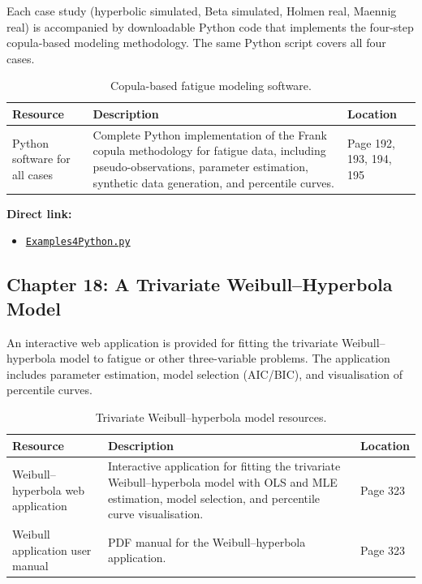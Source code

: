 Each case study (hyperbolic simulated, Beta simulated, Holmen real, Maennig real) is accompanied by downloadable Python code that implements the four-step copula-based modeling methodology. The same Python script covers all four cases.

\begin{table}[H]
\centering
\caption{Copula-based fatigue modeling software.}
\begin{tabular}{p{3.5cm}p{8cm}p{2.5cm}}
\toprule
\textbf{Resource} & \textbf{Description} & \textbf{Location} \\
\midrule
Python software for all cases & Complete Python implementation of the Frank copula methodology for fatigue data, including pseudo-observations, parameter estimation, synthetic data generation, and percentile curves. & Page 192, 193, 194, 195 \\
\bottomrule
\end{tabular}
\end{table}

\noindent
\textbf{Direct link:}
\begin{itemize}
    \item \href{https://raw.githubusercontent.com/EnriqueCastilloRon/mi-libro-interactivo/main/codigo/Examples4Python.py}{\nolinkurl{Examples4Python.py}}
\end{itemize}

\subsection{Chapter 18: A Trivariate Weibull–Hyperbola Model}

An interactive web application is provided for fitting the trivariate Weibull–hyperbola model to fatigue or other three-variable problems. The application includes parameter estimation, model selection (AIC/BIC), and visualisation of percentile curves.

\begin{table}[H]
\centering
\caption{Trivariate Weibull–hyperbola model resources.}
\begin{tabular}{p{3.5cm}p{8cm}p{2.5cm}}
\toprule
\textbf{Resource} & \textbf{Description} & \textbf{Location} \\
\midrule
Weibull–hyperbola web application & Interactive application for fitting the trivariate Weibull–hyperbola model with OLS and MLE estimation, model selection, and percentile curve visualisation. & Page 323 \\
Weibull application user manual & PDF manual for the Weibull–hyperbola application. & Page 323 \\
\bottomrule
\end{tabular}
\end{table}

